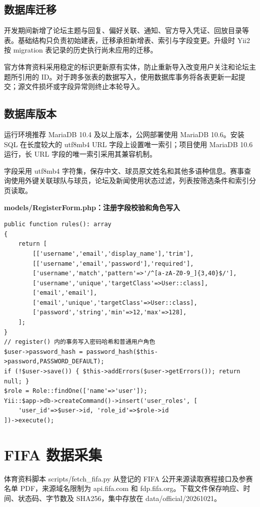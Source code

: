 \documentclass[UTF8,a4paper,11pt]{ctexart}
\begin{document}
\subsection{数据库迁移}
开发期间新增了论坛主题与回复、偏好关联、通知、官方导入凭证、回放目录等表。基础结构只负责初始建表，迁移承担新增表、索引与字段变更。升级时 Yii2 按 migration 表记录的历史执行尚未应用的迁移。

官方体育资料采用稳定的标识更新原有实体，防止重新导入改变用户关注和论坛主题所引用的 ID。对于跨多张表的数据写入，使用数据库事务将各表更新一起提交；源文件损坏或字段异常则终止本轮导入。

\subsection{数据库版本}
运行环境推荐 MariaDB 10.4 及以上版本，公网部署使用 MariaDB 10.6。安装 SQL 在长度较大的 utf8mb4 URL 字段上设置唯一索引；项目使用 MariaDB 10.6 运行，长 URL 字段的唯一索引采用其兼容机制。

字段采用 utf8mb4 字符集，保存中文、球员原文姓名和其他多语种信息。赛事查询使用外键关联球队与球员，论坛及新闻使用状态过滤，列表按筛选条件和索引分页读取。


\noindent\textbf{models/RegisterForm.php：注册字段校验和角色写入}\par\vspace{2pt}
\begin{lstlisting}
public function rules(): array
{
    return [
        [['username','email','display_name'],'trim'],
        [['username','email','password'],'required'],
        ['username','match','pattern'=>'/^[a-zA-Z0-9_]{3,40}$/'],
        ['username','unique','targetClass'=>User::class],
        ['email','email'],
        ['email','unique','targetClass'=>User::class],
        ['password','string','min'=>12,'max'=>128],
    ];
}
// register() 内的事务写入密码哈希和普通用户角色
$user->password_hash = password_hash($this->password,PASSWORD_DEFAULT);
if (!$user->save()) { $this->addErrors($user->getErrors()); return null; }
$role = Role::findOne(['name'=>'user']);
Yii::$app->db->createCommand()->insert('user_roles', [
    'user_id'=>$user->id, 'role_id'=>$role->id
])->execute();
\end{lstlisting}

\section{FIFA 数据采集}
体育资料脚本 scripts/fetch\_fifa.py 从登记的 FIFA 公开来源读取赛程接口及参赛名单 PDF，来源域名限制为 api.fifa.com 和 fdp.fifa.org。下载文件保存响应、时间、状态码、字节数及 SHA256，集中存放在 data/official/20261021。
\end{document}

